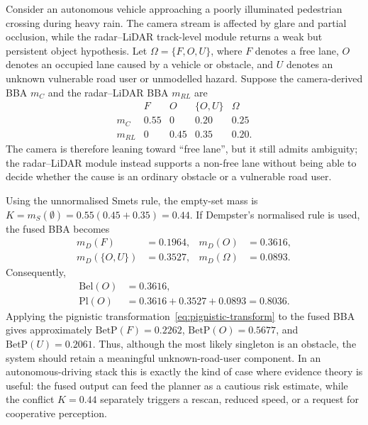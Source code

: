 \documentclass[graybox,envcountchap]{style/SNmono}
\begin{document}
\begin{example}
Consider an autonomous vehicle approaching a poorly illuminated pedestrian crossing during heavy rain. The camera stream is affected by glare and partial occlusion, while the radar--LiDAR track-level module returns a weak but persistent object hypothesis. Let
\(\Omega=\{F,O,U\}\), where \(F\) denotes a free lane, \(O\) denotes an occupied lane caused by a vehicle or obstacle, and \(U\) denotes an unknown vulnerable road user or unmodelled hazard. Suppose the camera-derived BBA \(m_C\) and the radar--LiDAR BBA \(m_{RL}\) are
\begin{equation}
\begin{array}{c|cccc}
 & F & O & \{O,U\} & \Omega \\
\hline
m_C & 0.55 & 0 & 0.20 & 0.25 \\
m_{RL} & 0 & 0.45 & 0.35 & 0.20 .
\end{array}
\label{eq:evidence-example-bbas}
\end{equation}
The camera is therefore leaning toward ``free lane'', but it still admits ambiguity; the radar--LiDAR module instead supports a non-free lane without being able to decide whether the cause is an ordinary obstacle or a vulnerable road user.

Using the unnormalised Smets rule, the empty-set mass is
\(K=m_S(\emptyset)=0.55(0.45+0.35)=0.44\). If Dempster's normalised rule is used, the fused BBA becomes
\begin{equation}
\begin{aligned}
m_D(F)&=0.1964, &
m_D(O)&=0.3616,\\
m_D(\{O,U\})&=0.3527, &
m_D(\Omega)&=0.0893 .
\end{aligned}
\end{equation}
Consequently,
\begin{equation}
\begin{aligned}
\mathrm{Bel}(O)&=0.3616,\\
\mathrm{Pl}(O)&=0.3616+0.3527+0.0893=0.8036 .
\end{aligned}
\end{equation}
Applying the pignistic transformation~\eqref{eq:pignistic-transform} to the fused BBA gives approximately \(\mathrm{BetP}(F)=0.2262\), \(\mathrm{BetP}(O)=0.5677\), and \(\mathrm{BetP}(U)=0.2061\). Thus, although the most likely singleton is an obstacle, the system should retain a meaningful unknown-road-user component. In an autonomous-driving stack this is exactly the kind of case where evidence theory is useful: the fused output can feed the planner as a cautious risk estimate, while the conflict \(K=0.44\) separately triggers a rescan, reduced speed, or a request for cooperative perception. 
\end{example}
\end{document}
